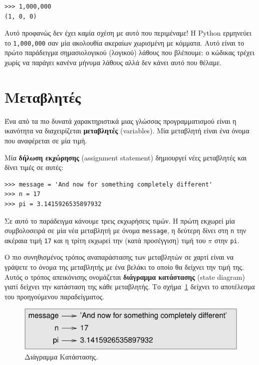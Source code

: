 \documentclass[10pt]{book}
\begin{document}
\begin{verbatim}
>>> 1,000,000
(1, 0, 0)
\end{verbatim}
%

Αυτό προφανώς δεν έχει καμία σχέση με αυτό που περιμέναμε!  Η 
Python  ερμηνεύει το  {\tt 1,000,000}  σαν μία ακολουθία
ακεραίων χωρισμένη με κόμματα.  Αυτό είναι το πρώτο παράδειγμα σημασιολογικού (λογικού) λάθους που βλέπουμε: ο κώδικας τρέχει χωρίς να παράγει κανένα μήνυμα
λάθους αλλά δεν κάνει αυτό που θέλαμε.



\section{Μεταβλητές}
\label{variables}
Ένα από τα πιο δυνατά χαρακτηριστικά μιας γλώσσας προγραμματισμού
είναι η ικανότητα να διαχειρίζεται {\bf μεταβλητές} (variables). Μία μεταβλητή είναι ένα όνομα που αναφέρεται σε μία τιμή.

Μία {\bf δήλωση εκχώρησης} (assignment statement) δημιουργεί νέες μεταβλητές και δίνει τιμές σε αυτές:

\begin{verbatim}
>>> message = 'And now for something completely different'
>>> n = 17
>>> pi = 3.1415926535897932
\end{verbatim}
%

Σε αυτό το παράδειγμα κάνουμε τρεις εκχωρήσεις τιμών. Η πρώτη εκχωρεί
μία συμβολοσειρά σε μία νέα μεταβλητή με όνομα {\tt message}, 
η δεύτερη δίνει στη {\tt n} την ακέραια τιμή {\tt 17} και
η τρίτη εκχωρεί την (κατά προσέγγιση) τιμή του $\pi$ στην {\tt pi}.

Ο πιο συνηθισμένος τρόπος αναπαράστασης των μεταβλητών σε χαρτί είναι να γράψετε το όνομα της μεταβλητής με ένα βελάκι το οποίο θα δείχνει την τιμή της. Αυτός ο τρόπος απεικόνισης ονομάζεται {\bf διάγραμμα κατάστασης} (state diagram) γιατί δείχνει την κατάσταση της κάθε μεταβλητής. Το σχήμα~\ref{fig.state2} δείχνει το αποτέλεσμα του προηγούμενου παραδείγματος.

\begin{figure}
\centerline
{\includegraphics[scale=0.8]{figs/state2.pdf}}
\caption{Διάγραμμα Κατάστασης.}
\label{fig.state2}
\end{figure}
\end{document}
